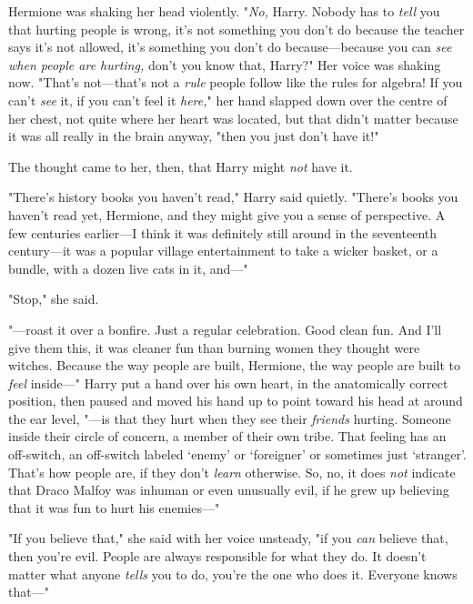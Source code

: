 Hermione was shaking her head violently. "\emph{No,} Harry. Nobody has to
\emph{tell} you that hurting people is wrong, it's not something you don't do
because the teacher says it's not allowed, it's something you don't do
because---because you can \emph{see when people are hurting,} don't you know
that, Harry?" Her voice was shaking now. "That's not---that's not a \emph{rule}
people follow like the rules for algebra! If you can't \emph{see} it, if you
can't feel it \emph{here,}" her hand slapped down over the centre of her chest,
not quite where her heart was located, but that didn't matter because it was
all really in the brain anyway, "then you just don't have it!"

The thought came to her, then, that Harry might \emph{not} have it.

"There's history books you haven't read," Harry said quietly. "There's books
you haven't read yet, Hermione, and they might give you a sense of perspective.
A few centuries earlier---I think it was definitely still around in the
seventeenth century---it was a popular village entertainment to take a wicker
basket, or a bundle, with a dozen live cats in it, and---"

"Stop," she said.

"---roast it over a bonfire. Just a regular celebration. Good clean fun. And
I'll give them this, it was cleaner fun than burning women they thought were
witches. Because the way people are built, Hermione, the way people are built
to \emph{feel} inside---" Harry put a hand over his own heart, in the
anatomically correct position, then paused and moved his hand up to point
toward his head at around the ear level, "---is that they hurt when they see
their \emph{friends} hurting. Someone inside their circle of concern, a member
of their own tribe. That feeling has an off-switch, an off-switch labeled
`enemy' or `foreigner' or sometimes just `stranger'. That's how people are, if
they don't \emph{learn} otherwise. So, no, it does \emph{not} indicate that
Draco Malfoy was inhuman or even unusually evil, if he grew up believing that
it was fun to hurt his enemies---"

"If you believe that," she said with her voice unsteady, "if you
\emph{can} believe that, then you're evil. People are always responsible for
what they do. It doesn't matter what anyone \emph{tells} you to do, you're the
one who does it. Everyone knows that---"

